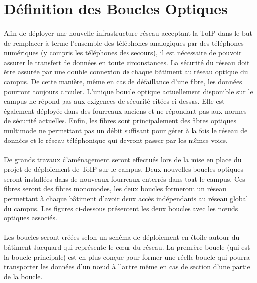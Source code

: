 \section{Définition des Boucles Optiques}

\paragraph{} Afin de déployer une nouvelle infrastructure réseau acceptant la ToIP dans le but de remplacer à terme l'ensemble des téléphones analogiques par des téléphones numériques (y compris les téléphones des secours), il est nécessaire de pouvoir assurer le transfert de données en toute circonstances. La sécurité du réseau doit être assurée par une double connexion de chaque bâtiment au réseau optique du campus. De cette manière, même en cas de défaillance d'une fibre, les données pourront toujours circuler. L'unique boucle optique actuellement disponible sur le campus ne répond pas aux exigences de sécurité citées ci-dessus. Elle est également déployée dans des fourreaux anciens et ne répondant pas aux normes de sécurité actuelles. Enfin, les fibres sont principalement des fibres optiques multimode ne permettant pas un débit suffisant pour gérer à la fois le réseau de données et le réseau téléphonique qui devront passer par les mêmes voies.

\paragraph{} De grands travaux d'aménagement seront effectués lors de la mise en place du projet de déploiement de ToIP sur le campus. Deux nouvelles boucles optiques seront installées dans de nouveaux fourreaux enterrés dans tout le campus. Ces fibres seront des fibres monomodes, les deux boucles formeront un réseau permettant à chaque bâtiment d'avoir deux accès indépendants au réseau global du campus. Les figures ci-dessous présentent les deux boucles avec les nœuds optiques associés.

\paragraph{} Les boucles seront créées selon un schéma de déploiement en étoile autour du bâtiment Jacquard qui représente le cœur du réseau. La première boucle (qui est la boucle principale) est en plus conçue pour former une réelle boucle qui pourra transporter les données d'un nœud à l'autre même en cas de section d'une partie de la boucle.


